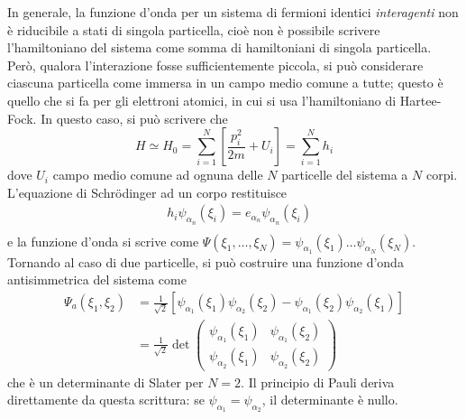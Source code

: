 \documentclass[11pt, a4paper]{scrartcl}
\theoremstyle{style}
\numberwithin{equation}{subsection}
\begin{document}
In generale, la funzione d'onda per un sistema di fermioni identici \textit{interagenti} non \`e riducibile a stati di singola particella, cio\`e non \`e possibile scrivere l'hamiltoniano del sistema come somma di hamiltoniani di singola particella.
Per\`o, qualora l'interazione fosse sufficientemente piccola, si pu\`o considerare ciascuna particella come immersa in un campo medio comune a tutte; questo \`e quello che si fa per gli elettroni atomici, in cui si usa l'hamiltoniano di Hartee-Fock.
In questo caso, si pu\`o scrivere che
\[
H \simeq H_0 = \sum_{i=1}^{N} \left[ \frac{p_i^2}{2m} + U_i \right] = \sum_{i=1}^{N} h_i
\] 
dove $U_i$ campo medio comune ad ognuna delle $N$ particelle del sistema a $N$ corpi.
L'equazione di Schr\"odinger ad un corpo restituisce 
\[
\begin{split}
	&h_i \psi _{\alpha _n} (\xi _i) = e_{\alpha _n} \psi _{\alpha _n} (\xi _i)\\
	& 
\end{split}
\] 
e la funzione d'onda si scrive come $\Psi (\xi _1,\ldots,\xi _N) = \psi _{\alpha _1}(\xi _1) \ldots \psi _{\alpha _N}(\xi _N)$.
Tornando al caso di due particelle, si pu\`o costruire una funzione d'onda antisimmetrica del sistema come
\[
\begin{split}
	\Psi _a(\xi _1,\xi _2) &= \frac{1}{\sqrt{2} } \left[ \psi _{\alpha _1}(\xi _1) \psi _{\alpha _2}(\xi _2) - \psi _{\alpha _1}(\xi _2) \psi _{\alpha _2}(\xi _1) \right] \\
			       &= \frac{1}{\sqrt{2} } \det \begin{pmatrix} \psi _{\alpha _1}(\xi _1) & \psi _{\alpha _1} (\xi _2) \\ \psi _{\alpha _2}(\xi _1) & \psi _{\alpha _2}(\xi _2) \end{pmatrix} 
\end{split}
\] 
che \`e un determinante di Slater per $N=2$.
Il principio di Pauli deriva direttamente da questa scrittura: se $\psi _{\alpha _1} = \psi _{\alpha _2}$, il determinante \`e nullo.
\end{document}
